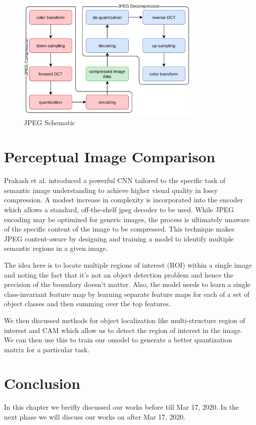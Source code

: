 \begin{figure}[!ht]
    \centering
    \includegraphics[width=0.80\textwidth]{../fig/midsemwork/jpeg-codec.png}
    \caption{JPEG Schematic}
    \label{fig:jpegSchematic}
\end{figure}


\section{Perceptual Image Comparison}

Prakash et al. \cite{Prakash2017} introduced a powerful CNN tailored to the specific task of semantic image understanding to achieve higher visual quality in lossy compression. 
A modest increase in complexity is incorporated into the encoder which allows a standard, off-the-shelf jpeg decoder to be used. 
While JPEG encoding may be optimized for generic images, the process is ultimately unaware of the specific content of the image to be compressed. 
This technique makes JPEG content-aware by designing and training a model to identify multiple semantic regions in a given image.


The idea here is to locate multiple regions of interest (ROI) within a single image and noting the fact that it's not an object detection problem and hence the precision of the boundary doesn't matter. 
Also, the model needs to learn a single class-invariant feature map by learning separate feature maps for each of a set of object classes and then summing over the top features.

We then discussed methods for object localization like multi-structure region of interest and CAM which allow us to detect the region of interest in the image.
We can then use this to train our omodel to generate a better quantization matrix for a particular task.


\section{Conclusion}

In this chapter we breifly discussed our works before till Mar 17, 2020. In the next phase we will discuss our works on after Mar 17, 2020.